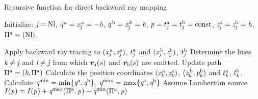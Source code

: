 \begin{algorithm}
\caption{Recursive function for direct backward ray mapping}\label{alg:recursiveraymapping}
Initialize: $\textit{j} = \textrm{Nl}$, $\textit{q}^{\,\textrm{a}}= \textit{x}^{\,\textrm{a}}_{\textit{j}}=-\textit{b}$, $\textit{q}^{\,\textrm{b}}= \textit{x}^{\,\textrm{b}}_{\textit{j}}=\textit{b}$, $\textit{p}_{\textrm{} \textit{}}=t^{\textrm{a}}_{\textit{j}}=t^{\textrm{b}}_{\textit{j}}=\textrm{const}$, $\textit{z}_{\textit{j}}^{\textrm{a}}=\textit{z}_{\textit{j}}^{\textrm{b}}= \textit{h}$, $\Pi^{\textrm{a}}=({\textrm{Nl}})$.
\begin{algorithmic}[1]
\State Apply backward ray tracing to $(\textit{x}^{\,\textrm{a}}_{\textit{j}},\textit{z}^{\textrm{a}}_{\textit{j}})$, $t_{\textit{j}}^{\textrm{a}}$ and $(\textit{x}^{\,\textrm{b}}_{\textit{j}},\textit{z}^{\textrm{b}}_{\textit{j}})$, $t_{\textit{j}}^{\textrm{b}}$ \State Determine the lines $\textit{k}\neq\textit{j}$ and $\textit{l}\neq\textit{j}$ from which $\textit{\textbf{r}}_{\textrm{a}}(s)$ and $\textit{\textbf{r}}_{\textrm{b}}(s)$ are emitted.
\State Update path $\Pi^{\textrm{a}}=(\textit{k}, \Pi^{\textrm{a}})$
\State Calculate the position coordinates $(\textit{x}^{\,\textrm{a}}_{\textit{k}},\textit{z}^{\textrm{a}}_{\textit{k}})$, $(\textit{z}^{\,\textrm{b}}_{\textit{k}}, \textit{p}^{\textrm{b}}_{\textit{k}})$ and $t_{\textit{k}}^{\textrm{a}}$, $t_{\textit{k}}^{\textrm{b}}$.
\If {$\lineaj = \lineak$}
\State{}
\Else  \State Calculate
$\textit{q}^{\textrm{min}} = \min\{\textit{q}^{\textrm{a}}, \textit{q}^{\textrm{b}}\}$, $\textit{q}^{\textrm{max}} = \max\{\textit{q}^{\textrm{a}}, \textit{q}^{\textrm{b}}\}$
\State Assume Lambertian source
\State $I(\textit{p}_{\textrm{} \textit{}}) = I(\textit{p}_{\textrm{} \textit{}})+\textit{q}^{\textrm{max}}(\Pi^{\textrm{a}}, \textit{p}_{\textrm{} \textit{}})
-\textit{q}^{\textrm{min}}(\Pi^{\textrm{a}}, \textit{p}_{\textrm{} \textit{}})$ 

\end{algorithmic}
\end{algorithm}
